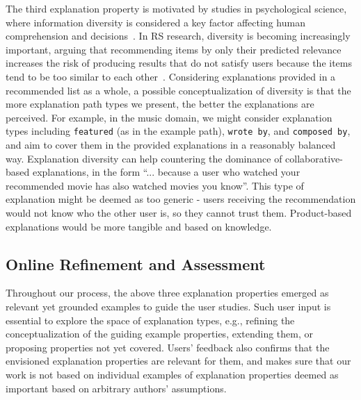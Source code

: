 \documentclass[sigconf]{acmart}
\begin{document}
\vspace{1mm}  
The third explanation property is motivated by studies in psychological science, where information diversity is considered a key factor affecting human comprehension and decisions~\cite{AdelmanBQ06}. 
In RS research, diversity is becoming increasingly important, arguing that recommending items by only their predicted relevance increases the risk of producing results that do not satisfy users because the items tend to be too similar to each other~\cite{DBLP:journals/tiis/KaminskasB17}. 
Considering explanations provided in a recommended list as a whole, a possible conceptualization of diversity is that the more explanation path types we present, the better the explanations are perceived. 
For example, in the music domain, we might consider explanation types including \texttt{featured} (as in the example path), \texttt{wrote by}, and \texttt{composed by}, and aim to cover them in the provided explanations in a reasonably balanced way. 
Explanation diversity can help countering the dominance of collaborative-based explanations, in the form ``... because a user who watched your recommended movie has also watched movies you know''. 
This type of explanation might be deemed as too generic - users receiving the recommendation would not know who the other user is, so they cannot trust them. 
Product-based explanations would be more tangible and based on knowledge. 

\subsection{Online Refinement and Assessment}\label{subsec:assessment}
Throughout our process, the above three explanation properties emerged as relevant yet grounded examples to guide the user studies. Such user input is essential to explore the space of explanation types, e.g., refining the conceptualization of the guiding example properties, extending them, or proposing properties not yet covered. Users' feedback also confirms that the envisioned explanation properties are relevant for them, and makes sure that our work is not based on individual examples of explanation properties deemed as important based on arbitrary authors' assumptions. 
\end{document}
